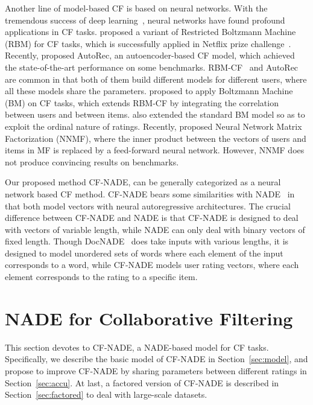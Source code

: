 \documentclass{article}
\newcommand{\cfnade}{CF-NADE\xspace}
\begin{document}
Another line of model-based CF is based on neural networks. With the
tremendous success of deep
learning~\citep{krizhevsky2012imagenet,szegedy2014going,he2015deep},
neural networks have found profound applications in CF
tasks. \citet{salakhutdinov2007restricted} proposed a variant of
Restricted Boltzmann Machine (RBM) for CF tasks, which is successfully
applied in Netflix prize
challenge~\citep{bennett2007netflix}. Recently,
\citet{sedhain2015autorec} proposed AutoRec, an autoencoder-based CF
model, which achieved the state-of-the-art performance on some
benchmarks. RBM-CF~\citep{salakhutdinov2007restricted} and
AutoRec~\citep{sedhain2015autorec} are common in that both of them
build different models for different users, where all these models
share the parameters.  \citet{phung2009ordinal} proposed to apply
Boltzmann Machine (BM) on CF tasks, which extends RBM-CF by
integrating the correlation between users and between
items. \citet{phung2009ordinal} also extended the standard BM model so
as to exploit the ordinal nature of ratings. Recently,
\citet{dziugaite2015neural} proposed Neural Network Matrix
Factorization (NNMF), where the inner product between the vectors of
users and items in MF is replaced by a feed-forward neural
network. However, NNMF does not produce convincing results on
benchmarks.

Our proposed method \cfnade, can be generally categorized as a neural
network based CF method. \cfnade bears some similarities with
NADE~\citep{larochelle2011neural} in that both model vectors with
neural autoregressive architectures. The crucial difference between
\cfnade and NADE is that \cfnade is designed to deal with vectors of
variable length, while NADE can only deal with binary vectors of fixed
length. Though DocNADE~\citep{larochelle2012neural} does take inputs
with various lengths, it is designed to model unordered sets of words
where each element of the input corresponds to a word, while \cfnade
models user rating vectors, where each element corresponds to the
rating to a specific item.




\section{NADE for Collaborative Filtering}
\label{sec:cfnade}



This section devotes to \cfnade, a NADE-based model for CF
tasks. Specifically, we describe the basic model of \cfnade in
Section~\ref{sec:model}, and propose to improve \cfnade by
sharing parameters between different ratings in
Section~\ref{sec:accu}. At last, a factored version of \cfnade is
described in Section~\ref{sec:factored} to deal with large-scale
datasets.
\end{document}
